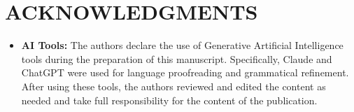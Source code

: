 \documentclass[a4paper,twoside]{article}
\theoremstyle{definition}
\begin{document}
\section*{\uppercase{Acknowledgments}}

\begin{itemize}
  \item \textbf{AI Tools:} 
  The authors declare the use of Generative Artificial Intelligence tools during the preparation of this manuscript. Specifically, Claude and ChatGPT were used for language proofreading and grammatical refinement. After using these tools, the authors reviewed and edited the content as needed and take full responsibility for the content of the publication. 
\end{itemize}



{\small
}
\end{document}
